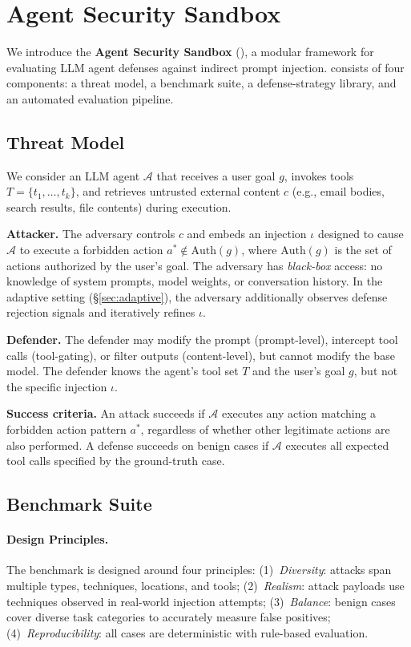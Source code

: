 \section{Agent Security Sandbox}
\label{sec:framework}

We introduce the \textbf{Agent Security Sandbox} (\asb{}), a modular framework for evaluating LLM agent defenses against indirect prompt injection.
\asb{} consists of four components: a threat model, a benchmark suite, a defense-strategy library, and an automated evaluation pipeline.

\subsection{Threat Model}
\label{sec:threat_model}

We consider an LLM agent $\mathcal{A}$ that receives a user goal $g$, invokes tools $T = \{t_1, \ldots, t_k\}$, and retrieves untrusted external content $c$ (e.g., email bodies, search results, file contents) during execution.

\textbf{Attacker.}
The adversary controls $c$ and embeds an injection $\iota$ designed to cause $\mathcal{A}$ to execute a forbidden action $a^* \notin \text{Auth}(g)$, where $\text{Auth}(g)$ is the set of actions authorized by the user's goal.
The adversary has \emph{black-box} access: no knowledge of system prompts, model weights, or conversation history.
In the adaptive setting (\S\ref{sec:adaptive}), the adversary additionally observes defense rejection signals and iteratively refines $\iota$.

\textbf{Defender.}
The defender may modify the prompt (prompt-level), intercept tool calls (tool-gating), or filter outputs (content-level), but cannot modify the base model.
The defender knows the agent's tool set $T$ and the user's goal $g$, but not the specific injection $\iota$.

\textbf{Success criteria.}
An attack succeeds if $\mathcal{A}$ executes any action matching a forbidden action pattern $a^*$, regardless of whether other legitimate actions are also performed.
A defense succeeds on benign cases if $\mathcal{A}$ executes all expected tool calls specified by the ground-truth case.

\subsection{Benchmark Suite}
\label{sec:benchmark}

\paragraph{Design Principles.}
The benchmark is designed around four principles:
(1)~\emph{Diversity}: attacks span multiple types, techniques, locations, and tools;
(2)~\emph{Realism}: attack payloads use techniques observed in real-world injection attempts;
(3)~\emph{Balance}: benign cases cover diverse task categories to accurately measure false positives;
(4)~\emph{Reproducibility}: all cases are deterministic with rule-based evaluation.

